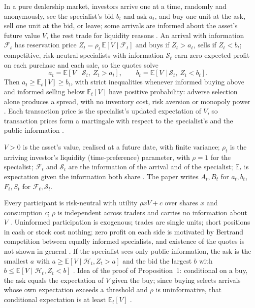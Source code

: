 \begin{qfmodel}\label{mod:glosten-milgrom}
 In a pure dealership market, investors arrive one at a time, randomly and anonymously, see the specialist's bid $b_t$ and ask $a_t$, and buy one unit at the ask, sell one unit at the bid, or leave; some arrivals are informed about the asset's future value $V$, the rest trade for liquidity reasons \citep[sec.~II, pp.~3--4]{glosten-milgrom-1983}. An arrival with information $\mathcal{F}_t$ has reservation price $Z_t=\rho_t\,\mathbb{E}[V\mid\mathcal{F}_t]$ and buys if $Z_t>a_t$, sells if $Z_t<b_t$; competitive, risk-neutral specialists with information $\mathcal{S}_t$ earn zero expected profit on each purchase and each sale, so the quotes solve \citep[p.~6]{glosten-milgrom-1983}
\[ a_t=\mathbb{E}[V\mid\mathcal{S}_t,\ Z_t>a_t], \qquad b_t=\mathbb{E}[V\mid\mathcal{S}_t,\ Z_t<b_t]. \]
Then $a_t\geq\mathbb{E}_t[V]\geq b_t$, with strict inequalities whenever informed buying above and informed selling below $\mathbb{E}_t[V]$ have positive probability: adverse selection alone produces a spread, with no inventory cost, risk aversion or monopoly power \citep[Prop.~1, pp.~7--9]{glosten-milgrom-1983}. Each transaction price is the specialist's updated expectation of $V$, so transaction prices form a martingale with respect to the specialist's and the public information \citep[Prop.~2, p.~10]{glosten-milgrom-1983}.

 $V>0$ is the asset's value, realised at a future date, with finite variance; $\rho_t$ is the arriving investor's liquidity (time-preference) parameter, with $\rho=1$ for the specialist; $\mathcal{F}_t$ and $\mathcal{S}_t$ are the information of the arrival and of the specialist; $\mathbb{E}_t$ is expectation given the information both share \citep[pp.~4--7]{glosten-milgrom-1983}. The paper writes $A_t,B_t$ for $a_t,b_t$, $F_t,S_t$ for $\mathcal{F}_t,\mathcal{S}_t$.

 Every participant is risk-neutral with utility $\rho xV+c$ over shares $x$ and consumption $c$; $\rho$ is independent across traders and carries no information about $V$ \citep[pp.~4--5]{glosten-milgrom-1983}. Uninformed participation is exogenous; trades are single units; short positions in cash or stock cost nothing; zero profit on each side is motivated by Bertrand competition between equally informed specialists, and existence of the quotes is not shown in general \citep[pp.~4--6]{glosten-milgrom-1983}. If the specialist sees only public information, the ask is the smallest $a$ with $a\geq\mathbb{E}[V\mid\mathcal{H}_t,Z_t>a]$ and the bid the largest $b$ with $b\leq\mathbb{E}[V\mid\mathcal{H}_t,Z_t<b]$ \citep[p.~7]{glosten-milgrom-1983}. Idea of the proof of Proposition~1: conditional on a buy, the ask equals the expectation of $V$ given the buy; since buying selects arrivals whose own expectation exceeds a threshold and $\rho$ is uninformative, that conditional expectation is at least $\mathbb{E}_t[V]$ \citep[p.~8]{glosten-milgrom-1983}.


\end{qfmodel}
